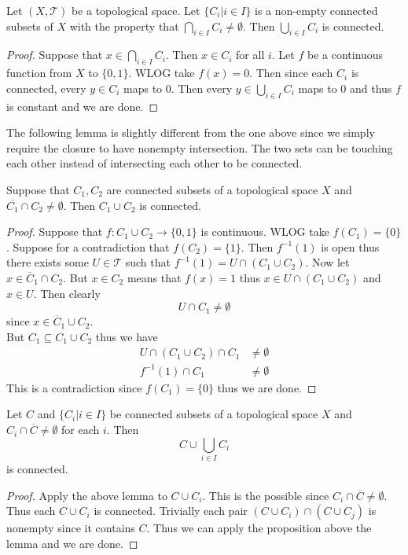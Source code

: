 \documentclass[a4paper]{article}
\begin{document}
\begin{prp}{}{} Let $(X,\mathcal{T})$ be a topological space. Let $\{C_i|i\in I\}$ is a non-empty connected subsets of $X$ with the property that $\bigcap_{i\in I}C_i\neq\emptyset$. Then $\bigcup_{i\in I}C_i$ is connected. 
\begin{proof}
Suppose that $x\in\bigcap_{i\in I}C_i$. Then $x\in C_i$ for all $i$. Let $f$ be a continuous function from $X$ to $\{0,1\}$. WLOG take $f(x)=0$. Then since each $C_i$ is connected, every $y\in C_i$ maps to $0$. Then every $y\in\bigcup_{i\in I}C_i$ maps to $0$ and thus $f$ is constant and we are done. 
\end{proof}
\end{prp}

The following lemma is slightly different from the one above since we simply require the closure to have nonempty intersection. The two sets can be touching each other instead of intersecting each other to be connected. 

\begin{lmm}{}{} Suppose that $C_1,C_2$ are connected subsets of a topological space $X$ and $\overline{C_1}\cap C_2\neq\emptyset$. Then $C_1\cup C_2$ is connected. 
\begin{proof}
Suppose that $f:C_1\cup C_2\to\{0,1\}$ is continuous. WLOG take $f(C_1)=\{0\}$. Suppose for a contradiction that $f(C_2)=\{1\}$. Then $f^{-1}(1)$ is open thus there exists some $U\in\mathcal{T}$ such that $f^{-1}(1)=U\cap(C_1\cup C_2)$. Now let $x\in\overline{C}_1\cap C_2$. But $x\in C_2$ means that $f(x)=1$ thus $x\in U\cap(C_1\cup C_2)$ and $x\in U$. Then clearly $$U\cap C_1\neq\emptyset$$ since $x\in\overline{C}_1\cup C_2$. \\
But $C_1\subseteq C_1\cup C_2$ thus we have 
\begin{align*}
U\cap (C_1\cup C_2)\cap C_1&\neq\emptyset\\
f^{-1}(1)\cap C_1&\neq\emptyset
\end{align*}
This is a contradiction since $f(C_1)=\{0\}$ thus we are done. 
\end{proof}
\end{lmm}

\begin{thm}{}{} Let $C$ and $\{C_i|i\in I\}$ be connected subsets of a topological space $X$ and $C_i\cap\overline{C}\neq\emptyset$ for each $i$. Then $$C\cup\bigcup_{i\in I}C_i$$ is connected. 
\begin{proof}
Apply the above lemma to $C\cup C_i$. This is the possible since $C_i\cap\overline{C}\neq\emptyset$. Thus each $C\cup C_i$ is connected. Trivially each pair $(C\cup C_i)\cap(C\cup C_j)$ is nonempty since it contains $C$. Thus we can apply the proposition above the lemma and we are done. 
\end{proof}
\end{thm}
\end{document}
